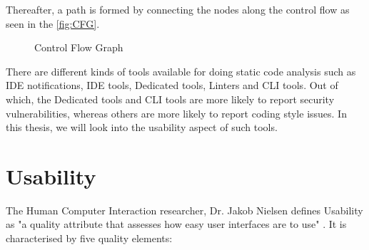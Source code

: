 Thereafter, a path is formed by connecting the nodes along the control flow as seen in the \autoref{fig:CFG}. \\

\begin{figure}
\centering


\caption{Control Flow Graph}
\label{fig:CFG}
\end{figure} 


There are different kinds of tools available for doing static code analysis such as IDE notifications, IDE tools, Dedicated tools, Linters and CLI tools. Out of which, the Dedicated tools and CLI tools are more likely to report security vulnerabilities, whereas others are more likely to report coding style issues. In this thesis, we will look into the usability aspect of such tools. 


\section{Usability}

The Human Computer Interaction researcher, Dr. Jakob Nielsen defines Usability as "a quality attribute that assesses how easy user interfaces are to use" \cite{usability-define}. It is characterised by five quality elements:

